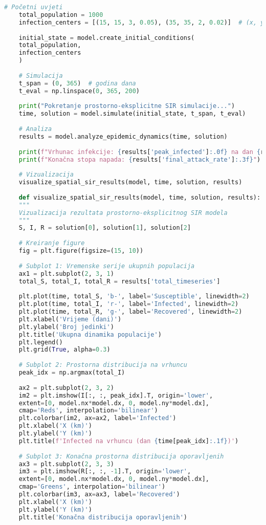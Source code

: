 \documentclass[11pt,oneside]{book}
\begin{document}
\begin{lstlisting}[language=Python, caption=SIR model s prostornom difuzijom]
	# Početni uvjeti
	total_population = 1000
	infection_centers = [(15, 15, 3, 0.05), (35, 35, 2, 0.02)]  # (x, y, radius, intensity)
	
	initial_state = model.create_initial_conditions(
	total_population, 
	infection_centers
	)
	
	# Simulacija
	t_span = (0, 365)  # godina dana
	t_eval = np.linspace(0, 365, 200)
	
	print("Pokretanje prostorno-eksplicitne SIR simulacije...")
	time, solution = model.simulate(initial_state, t_span, t_eval)
	
	# Analiza
	results = model.analyze_epidemic_dynamics(time, solution)
	
	print(f"Vrhunac infekcije: {results['peak_infected']:.0f} na dan {results['peak_time']:.1f}")
	print(f"Konačna stopa napada: {results['final_attack_rate']:.3f}")
	
	# Vizualizacija
	visualize_spatial_sir_results(model, time, solution, results)
	
	def visualize_spatial_sir_results(model, time, solution, results):
	"""
	Vizualizacija rezultata prostorno-eksplicitnog SIR modela
	"""
	S, I, R = solution[0], solution[1], solution[2]
	
	# Kreiranje figure
	fig = plt.figure(figsize=(15, 10))
	
	# Subplot 1: Vremenske serije ukupnih populacija
	ax1 = plt.subplot(2, 3, 1)
	total_S, total_I, total_R = results['total_timeseries']
	
	plt.plot(time, total_S, 'b-', label='Susceptible', linewidth=2)
	plt.plot(time, total_I, 'r-', label='Infected', linewidth=2)
	plt.plot(time, total_R, 'g-', label='Recovered', linewidth=2)
	plt.xlabel('Vrijeme (dani)')
	plt.ylabel('Broj jedinki')
	plt.title('Ukupna dinamika populacije')
	plt.legend()
	plt.grid(True, alpha=0.3)
	
	# Subplot 2: Prostorna distribucija na vrhuncu
	peak_idx = np.argmax(total_I)
	
	ax2 = plt.subplot(2, 3, 2)
	im2 = plt.imshow(I[:, :, peak_idx].T, origin='lower', 
	extent=[0, model.nx*model.dx, 0, model.ny*model.dx],
	cmap='Reds', interpolation='bilinear')
	plt.colorbar(im2, ax=ax2, label='Infected')
	plt.xlabel('X (km)')
	plt.ylabel('Y (km)')
	plt.title(f'Infected na vrhuncu (dan {time[peak_idx]:.1f})')
	
	# Subplot 3: Konačna prostorna distribucija oporavljenih
	ax3 = plt.subplot(2, 3, 3)
	im3 = plt.imshow(R[:, :, -1].T, origin='lower',
	extent=[0, model.nx*model.dx, 0, model.ny*model.dx],
	cmap='Greens', interpolation='bilinear')
	plt.colorbar(im3, ax=ax3, label='Recovered')
	plt.xlabel('X (km)')
	plt.ylabel('Y (km)')
	plt.title('Konačna distribucija oporavljenih')
	

\end{lstlisting}
\end{document}

